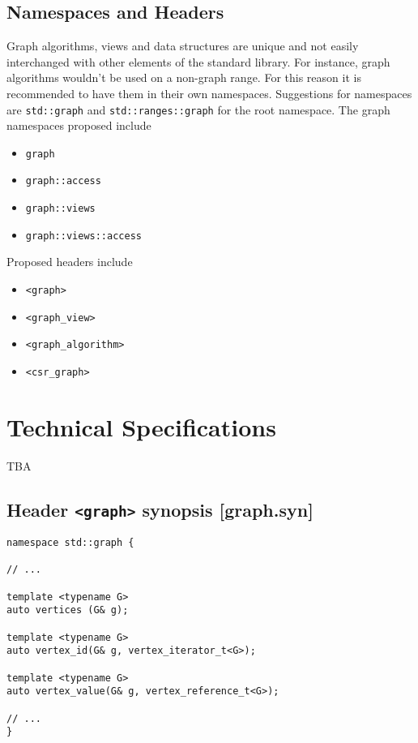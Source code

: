 \documentclass[10pt,onecolumn]{article}
\newcommand{\tcode}[1]{\lstinline[breaklines=true]{#1}}
\begin{document}
\subsection{Namespaces and Headers}
Graph algorithms, views and data structures are unique and not easily interchanged with other elements of the standard library. For
instance, graph algorithms wouldn't be used on a non-graph range. For this reason it is recommended to have them in their own 
namespaces. Suggestions for namespaces are \tcode{std::graph} and
\tcode{std::ranges::graph} for the root namespace. The graph namespaces proposed include
\begin{itemize}
\item[]\tcode{graph}
\item[]\tcode{graph::access}
\item[]\tcode{graph::views}
\item[]\tcode{graph::views::access}
\end{itemize}

Proposed headers include
\begin{itemize}
\item[]\tcode{<graph>}
\item[]\tcode{<graph_view>}
\item[]\tcode{<graph_algorithm>}
\item[]\tcode{<csr_graph>}
\end{itemize}

\section{Technical Specifications}
TBA

\subsection{Header \tcode{<graph>} synopsis [graph.syn]}

\begin{lstlisting}
namespace std::graph {

// ...

template <typename G>
auto vertices (G& g);

template <typename G>
auto vertex_id(G& g, vertex_iterator_t<G>);

template <typename G>
auto vertex_value(G& g, vertex_reference_t<G>);

// ...
}
\end{lstlisting}

\vspace{10pt}
\end{document}
